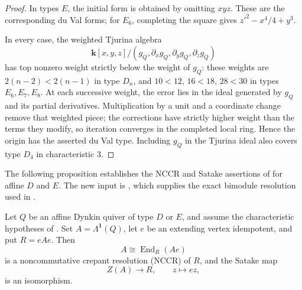 \documentclass[a4paper]{amsart}
\newcommand{\kk}{\mathbf{k}}
\numberwithin{equation}{section}
\begin{document}
\begin{proof}
In types $E$, the initial form is obtained by omitting $xyz$.
These are the corresponding du Val forms; for $E_6$, completing
the square gives $z'^2-x^4/4+y^3$.

In every case, the weighted Tjurina algebra
\[
 \kk[x,y,z]/(g_Q,\partial_xg_Q,\partial_yg_Q,\partial_zg_Q)
\]
has top nonzero weight strictly below the weight of $g_Q$: these
weights are $2(n-2)<2(n-1)$ in type $D_n$, and $10<12$, $16<18$,
$28<30$ in types $E_6,E_7,E_8$. At each successive weight, the error lies in the ideal generated
by $g_Q$ and its partial derivatives. Multiplication by a unit and a
coordinate change remove that weighted piece; the corrections have
strictly higher weight than the terms they modify, so iteration
converges in the completed local ring. Hence the origin has the asserted
du Val type. Including $g_Q$ in the Tjurina ideal also covers
type $D_4$ in characteristic $3$.
\end{proof}

The following proposition establishes the NCCR and Satake assertions
of \cite[Conjecture~1.4]{KS} for affine $D$ and $E$.
The new input is , which supplies the
exact bimodule resolution used in .

\begin{proposition}\label{prop:affine-de-nccr}
Let $Q$ be an affine Dynkin quiver of type $D$ or $E$, and assume
the characteristic hypotheses of .
Set $A=\Lambda^{\boldsymbol1}(Q)$, let $e$ be an extending vertex
idempotent, and put $R=eAe$. Then
\[
 A\cong\operatorname{End}_R(Ae)
\]
is a noncommutative crepant resolution (NCCR) of $R$, and the Satake map
\[
 Z(A)\longrightarrow R,\qquad z\longmapsto ez,
\]
is an isomorphism.
\end{proposition}
\end{document}
